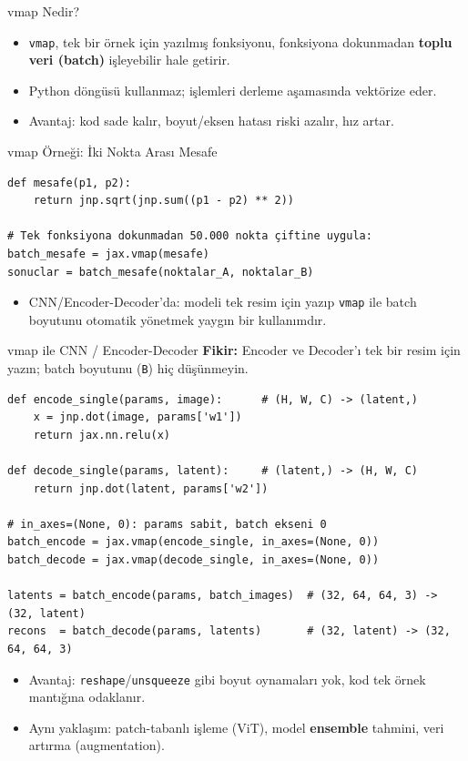 \documentclass[aspectratio=169]{beamer}
\begin{document}
\begin{frame}{vmap Nedir?}
  \begin{itemize}
    \item \texttt{vmap}, tek bir örnek için yazılmış fonksiyonu, fonksiyona dokunmadan \textbf{toplu veri (batch)} işleyebilir hale getirir.
    \item Python döngüsü kullanmaz; işlemleri derleme aşamasında vektörize eder.
    \item Avantaj: kod sade kalır, boyut/eksen hatası riski azalır, hız artar.
  \end{itemize}
\end{frame}

\begin{frame}[fragile]{vmap Örneği: İki Nokta Arası Mesafe}
  \begin{lstlisting}
def mesafe(p1, p2):
    return jnp.sqrt(jnp.sum((p1 - p2) ** 2))

# Tek fonksiyona dokunmadan 50.000 nokta çiftine uygula:
batch_mesafe = jax.vmap(mesafe)
sonuclar = batch_mesafe(noktalar_A, noktalar_B)
  \end{lstlisting}
  \begin{itemize}
    \item CNN/Encoder-Decoder'da: modeli tek resim için yazıp \texttt{vmap} ile batch boyutunu otomatik yönetmek yaygın bir kullanımdır.
  \end{itemize}
\end{frame}

\begin{frame}[fragile]{vmap ile CNN / Encoder-Decoder}
  \textbf{Fikir:} Encoder ve Decoder'ı tek bir resim için yazın; batch boyutunu (\texttt{B}) hiç düşünmeyin.
  \begin{lstlisting}
def encode_single(params, image):      # (H, W, C) -> (latent,)
    x = jnp.dot(image, params['w1'])
    return jax.nn.relu(x)

def decode_single(params, latent):     # (latent,) -> (H, W, C)
    return jnp.dot(latent, params['w2'])

# in_axes=(None, 0): params sabit, batch ekseni 0
batch_encode = jax.vmap(encode_single, in_axes=(None, 0))
batch_decode = jax.vmap(decode_single, in_axes=(None, 0))

latents = batch_encode(params, batch_images)  # (32, 64, 64, 3) -> (32, latent)
recons  = batch_decode(params, latents)       # (32, latent) -> (32, 64, 64, 3)
  \end{lstlisting}
  \begin{itemize}
    \item Avantaj: \texttt{reshape}/\texttt{unsqueeze} gibi boyut oynamaları yok, kod tek örnek mantığına odaklanır.
    \item Aynı yaklaşım: patch-tabanlı işleme (ViT), model \textbf{ensemble} tahmini, veri artırma (augmentation).
  \end{itemize}
\end{frame}
\end{document}
